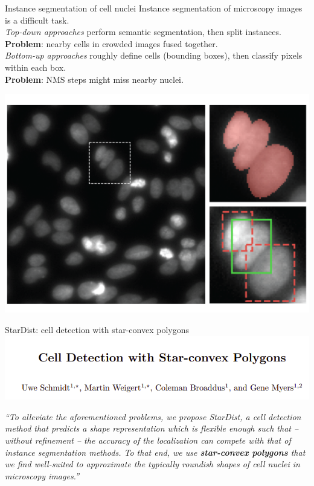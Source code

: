 \documentclass[9pt, aspectratio=169]{beamer}
\begin{document}
\begin{frame}
    {Instance segmentation of cell nuclei}
    Instance segmentation of microscopy images is a difficult task.\\

    \textit{Top-down approaches} perform semantic segmentation, then split instances.\\
    \textbf{Problem}: nearby cells in crowded images fused together.\\

    \textit{Bottom-up approaches} roughly define cells (bounding boxes), then classify pixels within each box.\\
    \textbf{Problem}: NMS steps might miss nearby nuclei.

    \centering
    \includegraphics[width=.5\textwidth]{Schmidt2018_problems.png}
\end{frame}

\begin{frame}
    {StarDist: cell detection with star-convex polygons}
    \centering
    \includegraphics[width=\textwidth]{Schmidt2018_title.png}

    \raggedright
    \textit{``To alleviate the aforementioned problems, we propose StarDist, a cell detection method that predicts a shape representation which is flexible enough such that – without refinement – the accuracy of the localization can compete
        with that of instance segmentation methods. To that end, we use \textbf{star-convex polygons} that we find well-suited to approximate the typically roundish shapes of cell nuclei in microscopy images.''}
\end{frame}
\end{document}

